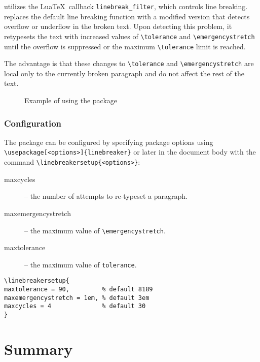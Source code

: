 \documentclass{ltugboat}
\begin{document}
 utilizes the Lua\TeX\ callback \verb|linebreak_filter|,
which controls line breaking.  replaces the default line
breaking function with a modified version that detects overflow or underflow in
the broken text. Upon detecting this problem, it retypesets the text with
increased values of \verb|\tolerance| and \verb|\emergencystretch| until the
overflow is suppressed or the maximum \verb|\tolerance| limit is reached.

The advantage is that these changes to \verb|\tolerance| and
\verb|\emergencystretch| are local only to the currently broken paragraph and
do not affect the rest of the text.

\begin{figure*}
  \caption{Example of using the  package}
  \label{fig:linebreaker}
\end{figure*}

\subsubsection{Configuration}

The  package can be configured by specifying package
options using 
\texttt{\textbackslash usepackage[<options>]\{linebreaker\}} or later in the
document body with the command 
\texttt{\textbackslash linebreakersetup\{<options>\}}:

\begin{description}
  \item[maxcycles] – the number of attempts to re-typeset a paragraph.
  \item[maxemergencystretch] – the maximum value of \verb|\emergencystretch|.
  \item[maxtolerance] – the maximum value of \verb|tolerance|.
\end{description}

\begin{verbatim}
\linebreakersetup{
maxtolerance = 90,         % default 8189
maxemergencystretch = 1em, % default 3em
maxcycles = 4              % default 30
}
\end{verbatim}

\section{Summary}
\end{document}
